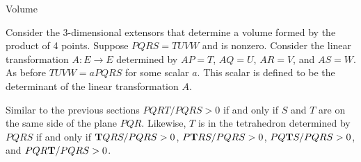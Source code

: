 \documentclass[fleqn]{amsart}
\begin{document}
\begin{section}{Volume}

Consider the 3-dimensional extensors that determine a volume
formed by the product of 4 points. Suppose $PQRS = TUVW$ and
is nonzero. Consider the linear transformation $A\colon E\to E$
determined by $AP = T$, $AQ = U$, $AR = V$, and $AS = W$.
As before $TUVW = aPQRS$ for some scalar $a$. This
scalar is defined to be the determinant of the linear
transformation $A$.

Similar to the previous sections $PQRT/PQRS > 0$ if and only
if $S$ and $T$ are on the same side of the plane $PQR$.
Likewise,
$T$ is in the tetrahedron determined by $PQRS$ if and only
if ${\bf T}QRS/PQRS > 0$, $P{\bf T}RS/PQRS > 0$, $PQ{\bf T}S/PQRS
> 0$, and $PQR{\bf T}/PQRS > 0$.

\end{section}
\end{document}
